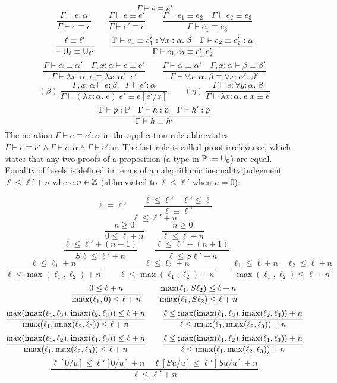 $$\boxed{\Gamma\vdash e\equiv e'}$$
$$\frac{\Gamma\vdash e:\alpha}{\Gamma\vdash e\equiv e}\qquad
\frac{\Gamma\vdash e\equiv e'}{\Gamma\vdash e'\equiv e}\qquad
\frac{\Gamma\vdash e_1\equiv e_2\quad\Gamma\vdash e_2\equiv e_3}{\Gamma\vdash e_1\equiv e_3}$$
$$\frac{\ell\equiv\ell'}{\vdash \U_\ell\equiv\U_{\ell'}}\qquad
\frac{\Gamma\vdash e_1\equiv e'_1:\forall x:\alpha.\;\beta\quad \Gamma\vdash e_2\equiv e'_2:\alpha}{\Gamma\vdash e_1\;e_2\equiv e'_1\;e'_2}$$
$$\frac{\Gamma\vdash\alpha\equiv \alpha'\quad \Gamma,x:\alpha\vdash e\equiv e'}{\Gamma\vdash\lambda x:\alpha.\;e\equiv \lambda x:\alpha'.\;e'}\qquad
\frac{\Gamma\vdash \alpha\equiv \alpha'\quad \Gamma,x:\alpha\vdash \beta\equiv \beta'}{\Gamma\vdash \forall x:\alpha.\;\beta\equiv \forall x:\alpha'.\;\beta'}$$
$$(\beta)\ \frac{\Gamma,x:\alpha\vdash e:\beta\quad\Gamma\vdash e':\alpha}{\Gamma\vdash (\lambda x:\alpha.\;e)\;e'\equiv e[e'/x]}\qquad
(\eta)\ \frac{\Gamma\vdash e:\forall y:\alpha.\;\beta}{\Gamma\vdash \lambda x:\alpha.\;e\;x\equiv e}$$
$$\frac{\Gamma\vdash p:\P\quad \Gamma\vdash h:p\quad \Gamma\vdash h':p}{\Gamma \vdash h\equiv h'}$$
The notation $\Gamma\vdash e\equiv e':\alpha$ in the application rule abbreviates $\Gamma\vdash e\equiv e'\land\Gamma\vdash e:\alpha\land\Gamma\vdash e':\alpha$. The last rule is called proof irrelevance, which states that any two proofs of a proposition (a type in $\mathbb{P}:=\mathsf{U}_0$) are equal. Equality of levels is defined in terms of an algorithmic inequality judgement $\ell\le\ell'+n$ where $n\in\mathbb{Z}$ (abbreviated to $\ell\le\ell'$ when $n=0$):

$$\boxed{\ell\equiv\ell'}\qquad \frac{\ell\le \ell'\quad \ell'\le\ell}{\ell\equiv\ell'}$$
$$\boxed{\ell\le \ell'+n}$$
$$\frac{n\ge 0}{0\le \ell+n}\qquad
\frac{n\ge 0}{\ell\le \ell+n}$$
$$\frac{\ell\le\ell'+(n-1)}{S\ell\le \ell'+n}\qquad
\frac{\ell\le\ell'+(n+1)}{\ell\le S\ell'+n}\qquad$$
$$\frac{\ell\le \ell_1+n}{\ell\le \max(\ell_1,\ell_2)+n}\qquad
\frac{\ell\le \ell_2+n}{\ell\le \max(\ell_1,\ell_2)+n}\qquad
\frac{\ell_1\le\ell+n\quad \ell_2\le \ell+n}{\max(\ell_1,\ell_2)\le \ell+n}$$
$$\frac{0\le\ell+n}{\operatorname{imax}(\ell_1,0)\le\ell+n}\qquad
\frac{\max(\ell_1,S\ell_2)\le\ell+n}{\operatorname{imax}(\ell_1,S\ell_2)\le\ell+n}$$
$$\frac{\max(\operatorname{imax}(\ell_1,\ell_3),\operatorname{imax}(\ell_2,\ell_3))\le\ell+n}{\operatorname{imax}(\ell_1,\operatorname{imax}(\ell_2,\ell_3))\le\ell+n}\qquad
\frac{\ell\le\max(\operatorname{imax}(\ell_1,\ell_3),\operatorname{imax}(\ell_2,\ell_3))+n}{\ell\le\operatorname{imax}(\ell_1,\operatorname{imax}(\ell_2,\ell_3))+n}$$
$$\frac{\max(\operatorname{imax}(\ell_1,\ell_2),\operatorname{imax}(\ell_1,\ell_3))\le\ell+n}{\operatorname{imax}(\ell_1,\max(\ell_2,\ell_3))\le\ell+n}\qquad
\frac{\ell\le\max(\operatorname{imax}(\ell_1,\ell_2),\operatorname{imax}(\ell_1,\ell_3))+n}{\ell\le\operatorname{imax}(\ell_1,\max(\ell_2,\ell_3))+n}$$
$$\frac{\ell[0/u]\le \ell'[0/u]+n\quad\ell[Su/u]\le \ell'[Su/u]+n}{\ell\le \ell'+n}$$

